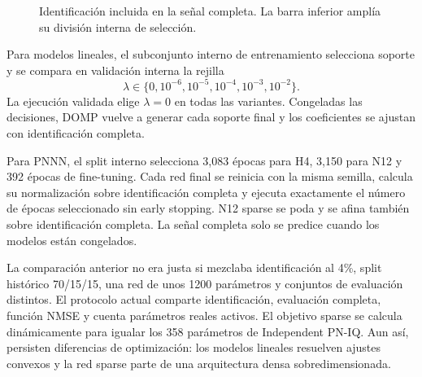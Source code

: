\documentclass[10pt,a4paper]{article}
\begin{document}
\begin{figure}[ht]
\centering
{}
\caption{Identificación incluida en la señal completa. La barra inferior amplía su división interna de selección.}
\label{fig:split}
\end{figure}

Para modelos lineales, el subconjunto interno de entrenamiento selecciona
soporte y se compara en validación interna la rejilla
\[
\lambda\in\{0,10^{-6},10^{-5},10^{-4},10^{-3},10^{-2}\}.
\]
La ejecución validada elige $\lambda=0$ en todas las variantes. Congeladas las
decisiones, DOMP vuelve a generar cada soporte final y los coeficientes se
ajustan con identificación completa.

Para PNNN, el split interno selecciona 3,083 épocas para H4, 3,150 para N12 y
392 épocas de fine-tuning. Cada red final se reinicia con la misma semilla,
calcula su normalización sobre identificación completa y ejecuta exactamente el
número de épocas seleccionado sin early stopping. N12 sparse se poda y se
afina también sobre identificación completa. La señal completa solo se predice
cuando los modelos están congelados.

La comparación anterior no era justa si mezclaba identificación al 4\%, split
histórico 70/15/15, una red de unos 1200 parámetros y conjuntos de evaluación
distintos. El protocolo actual comparte identificación, evaluación completa,
función NMSE y cuenta parámetros reales activos. El objetivo sparse se calcula
dinámicamente para igualar los 358 parámetros de Independent PN-IQ. Aun así,
persisten diferencias de optimización: los modelos lineales resuelven ajustes
convexos y la red sparse parte de una arquitectura densa sobredimensionada.
\end{document}
